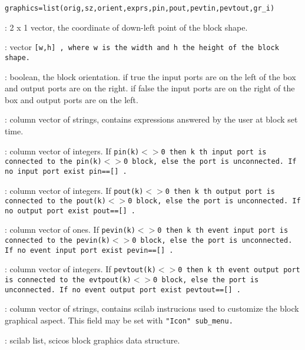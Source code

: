 


%
%


\label{scicosgraphics}

\begin{verbatim}
graphics=list(orig,sz,orient,exprs,pin,pout,pevtin,pevtout,gr_i)
\end{verbatim}
\begin{scitem}
\item[{\verb?orig?}]
: 2 x 1 vector, the coordinate of down-left point of the block shape.
\item[{\verb?sz?}]
: vector %
\tt [w,h]%
\rm , where %
\tt w %
\rm is the width and %
\tt h %
\rm the
height of the block shape.
\item[{\verb?orient?}]
: boolean, the block orientation. if true the input ports are on the
left of the box and output ports are on the right. if false  the input ports are on the
right of the box and output ports are on the left.  
\item[{\verb?exprs?}]
: column vector of strings,  contains expressions answered by the user
at block set time.
\item[{\verb?pin?}]
: column vector of integers. If %
\tt pin(k)$<$$>$0 %
\rm then  %
\tt k%
\rm th input
port is connected to the %
\tt pin(k)$<$$>$0 %
\rm block, else the port is
unconnected. If no input port exist %
\tt pin==[]%
\rm .
\item[{\verb?pout?}]
: column vector of integers.  If %
\tt pout(k)$<$$>$0 %
\rm then  %
\tt k%
\rm th output
port is connected to the %
\tt pout(k)$<$$>$0 %
\rm block, else the port is
unconnected. If no output port exist %
\tt pout==[]%
\rm .
\item[{\verb?pevtin?}]
: column vector of ones. If %
\tt pevin(k)$<$$>$0 %
\rm then  %
\tt k%
\rm th event input
port is connected to the %
\tt pevin(k)$<$$>$0 %
\rm block, else the port is
unconnected. If no event input port exist %
\tt pevin==[]%
\rm .
\item[{\verb?pevtout?}]
: column vector of integers.  If %
\tt pevtout(k)$<$$>$0 %
\rm then  %
\tt k%
\rm th
event output port is connected to the %
\tt evtpout(k)$<$$>$0 %
\rm block, else the port is
unconnected. If no event  output port exist %
\tt pevtout==[]%
\rm .
\item[{\verb?gr\_i?}]
: column vector of strings,  contains scilab instrucions used to
customize the block graphical aspect. This field may be set with
%
\tt "Icon" %
\rm sub\_menu.
\item[{\verb?graphics?}]
: scilab list, scicos block graphics data structure.
\end{scitem}%
